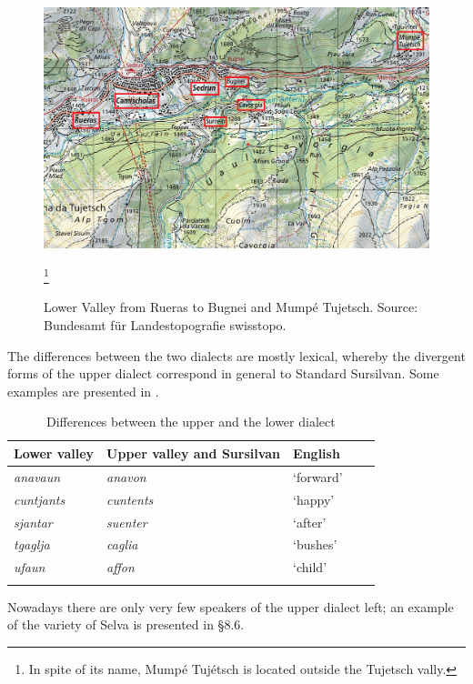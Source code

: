 \begin{figure}
	\includegraphics[height=.42\textheight]{figures/Lower Valley fourth.png}
	\caption{Lower Valley from Rueras to Bugnei and Mumpé Tujetsch. Source: Bundesamt für Landestopografie swisstopo.}\footnote{In spite of its name, Mumpé Tujétsch is located outside the Tujetsch vally.}
	\label{fig:lowervalley}
\end{figure}

The differences between the two dialects are mostly lexical, whereby the divergent forms of the upper dialect correspond in general to Standard Sursilvan. Some examples are presented in  \citep[97]{VicHendry2010}.

\begin{table}
	\caption{Differences between the upper and the lower dialect}
	\label{difdial}
	\begin{tabular}{lllll}
		\lsptoprule
		Lower valley &  Upper valley and Sursilvan & English\\
		\midrule
		\textit{anavaun} & \textit{anavon} & `forward' \\
		\textit{cuntjants} & \textit{cuntents} & `happy' \\
		\textit{sjantar} & \textit{suenter} & `after'\\
		\textit{tgaglja} & \textit{caglia} & `bushes'\\
		\textit{ufaun} & \textit{affon} & `child' \\
		\lspbottomrule
	\end{tabular}
\end{table}

Nowadays there are only very few speakers of the upper dialect left; an example of the variety of Selva is presented in §8.6.


